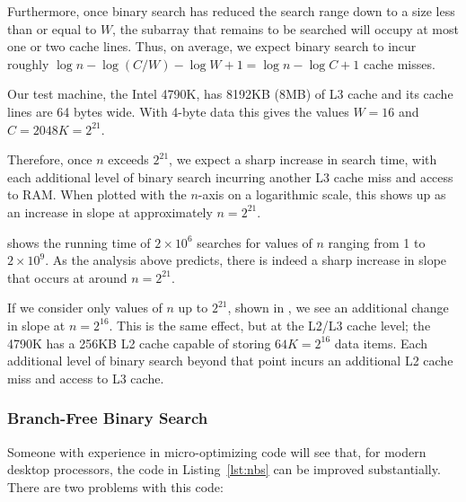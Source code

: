 \documentclass{patmorin}
\newcommand{\lstref}[1]{Listing~\ref{lst:#1}}
\begin{document}
Furthermore, once binary search has reduced the search range down to a
size less than or equal to $W$, the subarray that remains to be searched
will occupy at most one or two cache lines. Thus, on average, we expect
binary search to incur roughly $\log n -\log(C/W) - \log W + 1 = \log n -
\log C + 1$ cache misses.

Our test machine, the Intel 4790K, has 8192KB (8MB) of L3 cache and its
cache lines are 64 bytes wide.  With 4-byte data this gives the values
$W=16$ and $C=2048K=2^{21}$.  

Therefore, once $n$ exceeds $2^{21}$, we expect a sharp increase in
search time, with each additional level of binary search incurring
another L3 cache miss and access to RAM.  When plotted with the
$n$-axis on a logarithmic scale, this shows up as an increase in slope
at approximately $n=2^{21}$.

 shows the running time of $2\times 10^6$
searches for values of $n$ ranging from 1 to $2\times 10^9$.  As the
analysis above predicts, there is indeed a sharp increase in slope that
occurs at around $n=2^{21}$. 

If we consider only values of $n$ up to $2^{21}$, shown in
, we see an additional change in slope at
$n=2^{16}$.  This is the same effect, but at the L2/L3 cache level; the
4790K has a 256KB L2 cache capable of storing $64K=2^{16}$ data items.
Each additional level of binary search beyond that point incurs an
additional L2 cache miss and access to L3 cache.


\subsubsection{Branch-Free Binary Search}

Someone with experience in micro-optimizing code will see that, for
modern desktop processors, the code in \lstref{nbs} can be improved
substantially.  There are two problems with this code:
\end{document}

